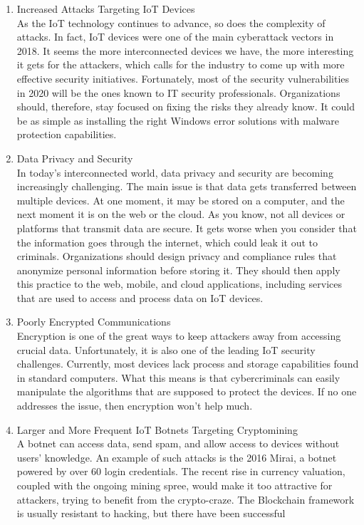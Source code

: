 \documentclass[12pt]{article}
\begin{document}
\begin{enumerate}
 	\item Increased Attacks Targeting IoT Devices\\
 	As the IoT technology continues to advance, so does the complexity of attacks. In fact, IoT devices were one of the main cyberattack vectors in 2018. It seems the more interconnected devices we have, the more interesting it gets for the attackers, which calls for the industry to come up with more effective security initiatives. Fortunately, most of the security vulnerabilities in 2020 will be the ones known to IT security professionals. Organizations should, therefore, stay focused on fixing the risks they already know. It could be as simple as installing the right Windows error solutions with malware protection capabilities.
 	\item Data Privacy and Security\\
 	In today’s interconnected world, data privacy and security are becoming increasingly challenging. The main issue is that data gets transferred between multiple devices. At one moment, it may be stored on a computer, and the next moment it is on the web or the cloud. As you know, not all devices or platforms that transmit data are secure. It gets worse when you consider that the information goes through the internet, which could leak it out to criminals. Organizations should design privacy and compliance rules that anonymize personal information before storing it. They should then apply this practice to the web, mobile, and cloud applications, including services that are used to access and process data on IoT devices.
 	\item Poorly Encrypted Communications\\
 	Encryption is one of the great ways to keep attackers away from accessing crucial data. Unfortunately, it is also one of the leading IoT security challenges. Currently, most devices lack process and storage capabilities found in standard computers. What this means is that cybercriminals can easily manipulate the algorithms that are supposed to protect the devices. If no one addresses the issue, then encryption won’t help much.
 	\item Larger and More Frequent IoT Botnets Targeting Cryptomining\\
 	A botnet can access data, send spam, and allow access to devices without users’ knowledge. An example of such attacks is the 2016 Mirai, a botnet powered by over 60 login credentials. The recent rise in currency valuation, coupled with the ongoing mining spree, would make it too attractive for attackers, trying to benefit from the crypto-craze. The Blockchain framework is usually resistant to hacking, but there have been successful

\end{enumerate}
\end{document}
